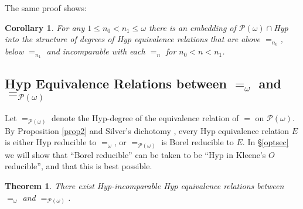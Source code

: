 \documentclass[11pt, english]{article}
\newtheorem{thm}{Theorem}
\newtheorem{prop}{Proposition}
\newtheorem{cor}{Corollary}
\begin{document}
The same proof shows:
\begin{cor}
For any $1\leq n_0 < n_1\leq\omega$ there is an embedding of
$\mathcal{P}(\omega)\cap $Hyp into the structure of degrees of Hyp
equivalence relations that are above $=_{n_0}$, below $=_{n_1}$ and
incomparable with each $=_n$ for $n_0<n<n_1$.
\end{cor}


\subsection{Hyp Equivalence Relations between $=_{\omega}$ and $=_{\mathcal{P}(\omega)}$}

Let $=_{\mathcal{P}(\omega)}$ denote the Hyp-degree of the
equivalence relation of $=$ on $\mathcal{P}(\omega)$. By Proposition
\ref{prop2} and Silver's dichotomy \cite{gao09}, every Hyp
equivalence relation $E$ is either Hyp reducible to $=_{\omega}$, or
$=_{\mathcal{P}(\omega)}$ is Borel reducible to $E$. In
\S\ref{optsec} we will show that ``Borel reducible'' can be taken to
be ``Hyp in Kleene's $O$ reducible'', and that this is best
possible.



\begin{thm}
There exist Hyp-incomparable Hyp equivalence relations between
$=_{\omega}$ and $=_{\mathcal{P}(\omega)}$.
\end{thm}
\end{document}
